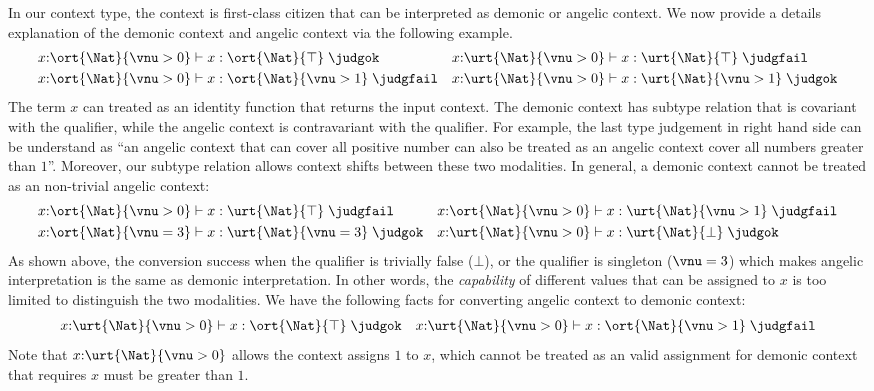 In our context type, the context is first-class citizen that can be interpreted as demonic or angelic context. We now provide a details explanation of the demonic context and angelic context via the following example.
\begin{align*}
  &x{:}\ort{\Nat}{\vnu > 0} \vdash x : \ort{\Nat}{\top}\;\judgok
  &&x{:}\urt{\Nat}{\vnu > 0} \vdash x : \urt{\Nat}{\top}\;\judgfail
  \\&x{:}\ort{\Nat}{\vnu > 0} \vdash x : \ort{\Nat}{\vnu > 1}\;\judgfail
  &&x{:}\urt{\Nat}{\vnu > 0} \vdash x : \urt{\Nat}{\vnu > 1}\;\judgok
\end{align*}\noindent
The term $x$ can treated as an identity function that returns the input context. The demonic context has subtype relation that is covariant with the qualifier, while the angelic context is contravariant with the qualifier. For example, the last type judgement in right hand side can be understand as ``an angelic context that can cover all positive number can also be treated as an angelic context cover all numbers greater than $1$''. Moreover, our subtype relation allows context shifts between these two modalities. In general, a demonic context cannot be treated as an non-trivial angelic context:
\begin{align*}
  &x{:}\ort{\Nat}{\vnu > 0} \vdash x : \urt{\Nat}{\top}\;\judgfail
  &&x{:}\ort{\Nat}{\vnu > 0} \vdash x : \urt{\Nat}{\vnu > 1}\;\judgfail
  \\&x{:}\ort{\Nat}{\vnu = 3} \vdash x : \urt{\Nat}{\vnu = 3}\;\judgok
  &&x{:}\urt{\Nat}{\vnu > 0} \vdash x : \urt{\Nat}{\bot}\;\judgok
\end{align*}\noindent
As shown above, the conversion success when the qualifier is trivially false ($\bot$), or the qualifier is singleton ($\vnu = 3$) which makes angelic interpretation is the same as demonic interpretation. In other words, the \emph{capability} of different values that can be assigned to $x$ is too limited to distinguish the two modalities. We have the following facts for converting angelic context to demonic context:
\begin{align*}
  x{:}\urt{\Nat}{\vnu > 0} \vdash x : \ort{\Nat}{\top}\;\judgok
  &&x{:}\urt{\Nat}{\vnu > 0} \vdash x : \ort{\Nat}{\vnu > 1}\;\judgfail
\end{align*}\noindent
Note that $x{:}\urt{\Nat}{\vnu > 0}$ allows the context assigns $1$ to $x$, which cannot be treated as an valid assignment for demonic context that requires $x$ must be greater than $1$.

